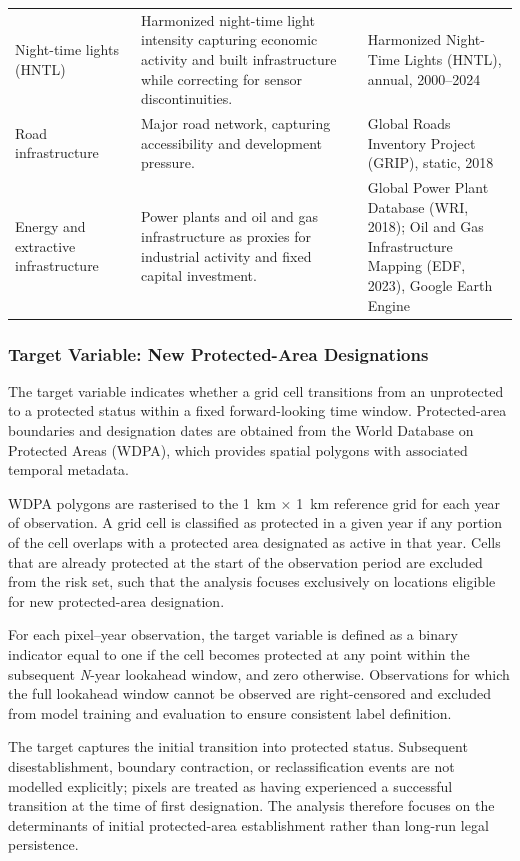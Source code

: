 \documentclass[12pt]{article}
\theoremstyle{break} %
\begin{document}
\begin{longtable}{%
  >{\raggedright\arraybackslash}p{0.25\linewidth}%
  >{\raggedright\arraybackslash}p{0.45\linewidth}%
  >{\raggedright\arraybackslash}p{0.30\linewidth}%
}
Night-time lights (HNTL) &
Harmonized night-time light intensity capturing economic activity and built infrastructure while correcting for sensor discontinuities. &
Harmonized Night-Time Lights (HNTL), annual, 2000--2024 \\

Road infrastructure &
Major road network, capturing accessibility and development pressure. &
Global Roads Inventory Project (GRIP), static, 2018 \\

Energy and extractive infrastructure &
Power plants and oil and gas infrastructure as proxies for industrial activity and fixed capital investment. &
Global Power Plant Database (WRI, 2018); Oil and Gas Infrastructure Mapping (EDF, 2023), Google Earth Engine \\

\end{longtable}

\subsubsection{Target Variable: New Protected-Area Designations}
\label{target-variable}

The target variable indicates whether a grid cell transitions from an unprotected to a protected status within a fixed forward-looking time window. Protected-area boundaries and designation dates are obtained from the World Database on Protected Areas (WDPA), which provides spatial polygons with associated temporal metadata.

WDPA polygons are rasterised to the 1~km $\times$ 1~km reference grid for each year of observation. A grid cell is classified as protected in a given year if any portion of the cell overlaps with a protected area designated as active in that year. Cells that are already protected at the start of the observation period are excluded from the risk set, such that the analysis focuses exclusively on locations eligible for new protected-area designation.

For each pixel--year observation, the target variable is defined as a binary indicator equal to one if the cell becomes protected at any point within the subsequent \textit{N}-year lookahead window, and zero otherwise. Observations for which the full lookahead window cannot be observed are right-censored and excluded from model training and evaluation to ensure consistent label definition.

The target captures the initial transition into protected status. Subsequent disestablishment, boundary contraction, or reclassification events are not modelled explicitly; pixels are treated as having experienced a successful transition at the time of first designation. The analysis therefore focuses on the determinants of initial protected-area establishment rather than long-run legal persistence.
\end{document}
